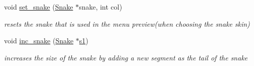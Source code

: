 \begin{DoxyCompactItemize}
void \hyperlink{group__snake_gafc851c81ca29b4d1e7e8890e7bf6bbf0}{set\+\_\+snake} (\hyperlink{structSnake}{Snake} $\ast$snake, int col)
\begin{DoxyCompactList}\small\item\em resets the snake that is used in the menu preview(when choosing the snake skin) \end{DoxyCompactList}\item 
void \hyperlink{group__snake_ga155db98fd681adcf82c1d07b8c4372f8}{inc\+\_\+snake} (\hyperlink{structSnake}{Snake} $\ast$\hyperlink{group__man__events_gaf79c0d77b0cca9ebf96bbbed1f88aed0}{s1})
\begin{DoxyCompactList}\small\item\em increases the size of the snake by adding a new segment as the tail of the snake \end{DoxyCompactList}\end{DoxyCompactItemize}
